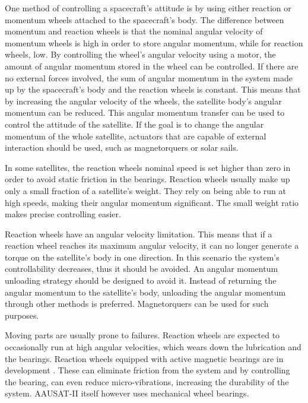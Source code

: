 One method of controlling a spacecraft's attitude is by using either reaction or momentum wheels attached to the spacecraft's body. The difference between momentum and reaction wheels is that the nominal angular velocity of momentum wheels is high in order to store angular momentum, while for reaction wheels, low. By controlling the wheel's angular velocity using a motor, the amount of angular momentum stored in the wheel can be controlled. If there are no external forces involved, the sum of angular momentum in the system made up by the spacecraft's body and the reaction wheels is constant. This means that by increasing the angular velocity of the wheels, the satellite body's angular momentum can be reduced. This angular momentum transfer can be used to control the attitude of the satellite. If the goal is to change the angular momentum of the whole satellite, actuators that are capable of external interaction should be used, such as magnetorquers or solar sails.

 In some satellites, the reaction wheels nominal speed is set higher than zero in order to avoid static friction in the bearings. Reaction wheels usually make up only a small fraction of a satellite's weight. They rely on being able to run at high speeds, making their angular momentum significant. The small weight ratio makes precise controlling easier.




Reaction wheels have an angular velocity limitation. This means that if a reaction wheel reaches its maximum angular velocity, it can no longer generate a torque on the satellite's body in one direction. In this scenario the system's controllability decreases, thus it should be avoided. An angular momentum unloading strategy should be designed to avoid it. Instead of returning the angular momentum to the satellite's body, unloading the angular momentum through other methods is preferred. Magnetorquers can be used for such purposes.

Moving parts are usually prone to failures. Reaction wheels are expected to occasionally run at high angular velocities, which wears down the lubrication and the bearings. Reaction wheels equipped with active magnetic bearings are in development \cite{MagneticReactWheel}. These can eliminate friction from the system and by controlling the bearing, can even reduce micro-vibrations, increasing the durability of the system. AAUSAT-II itself however uses mechanical wheel bearings.



